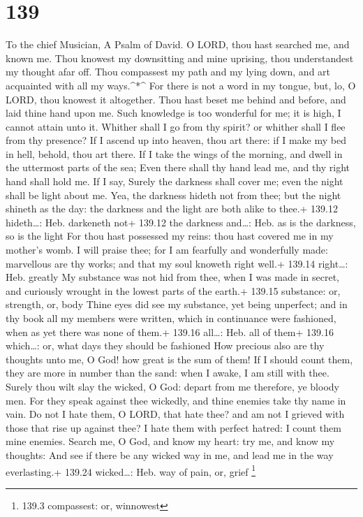 \hypertarget{section-139}{%
\section{139}\label{section-139}}

To the chief Musician, A Psalm of David.  O LORD, thou hast
searched me, and known me.  Thou knowest my downsitting and
mine uprising, thou understandest my thought afar off.  Thou
compassest my path and my lying down, and art acquainted with all my
ways.\^{}*\^{}  For there is not a word in my tongue, but,
lo, O LORD, thou knowest it altogether.  Thou hast beset me
behind and before, and laid thine hand upon me.  Such
knowledge is too wonderful for me; it is high, I cannot attain unto it.
 Whither shall I go from thy spirit? or whither shall I flee
from thy presence?  If I ascend up into heaven, thou art
there: if I make my bed in hell, behold, thou art there.  If
I take the wings of the morning, and dwell in the uttermost parts of the
sea;  Even there shall thy hand lead me, and thy right hand
shall hold me.  If I say, Surely the darkness shall cover
me; even the night shall be light about me.  Yea, the
darkness hideth not from thee; but the night shineth as the day: the
darkness and the light are both alike to thee.+ 139.12 hideth\ldots:
Heb. darkeneth not+ 139.12 the darkness and\ldots: Heb. as is the
darkness, so is the light  For thou hast possessed my
reins: thou hast covered me in my mother's womb.  I will
praise thee; for I am fearfully and wonderfully made: marvellous are thy
works; and that my soul knoweth right well.+ 139.14 right\ldots: Heb.
greatly  My substance was not hid from thee, when I was
made in secret, and curiously wrought in the lowest parts of the earth.+
139.15 substance: or, strength, or, body  Thine eyes did
see my substance, yet being unperfect; and in thy book all my members
were written, which in continuance were fashioned, when as yet there was
none of them.+ 139.16 all\ldots: Heb. all of them+ 139.16 which\ldots:
or, what days they should be fashioned  How precious also
are thy thoughts unto me, O God! how great is the sum of them!
 If I should count them, they are more in number than the
sand: when I awake, I am still with thee.  Surely thou wilt
slay the wicked, O God: depart from me therefore, ye bloody men.
 For they speak against thee wickedly, and thine enemies
take thy name in vain.  Do not I hate them, O LORD, that
hate thee? and am not I grieved with those that rise up against thee?
 I hate them with perfect hatred: I count them mine
enemies.  Search me, O God, and know my heart: try me, and
know my thoughts:  And see if there be any wicked way in
me, and lead me in the way everlasting.+ 139.24 wicked\ldots: Heb. way
of pain, or, grief \footnote{139.3 compassest: or, winnowest}

